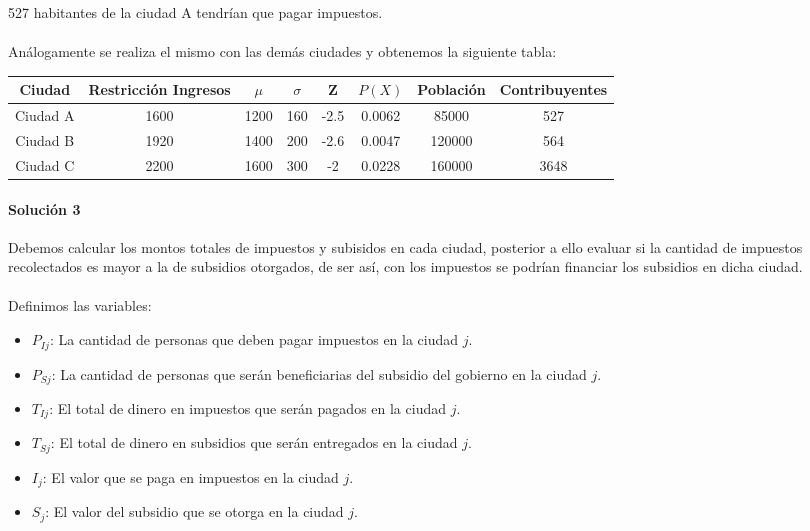 \documentclass{article}
\begin{document}
527 habitantes de la ciudad A tendrían que pagar impuestos.

\paragraph{} Análogamente se realiza el mismo con las demás ciudades y obtenemos la siguiente tabla:


\begin{center}
	\begin{tabular}{ | c | c | c | c | c | c | c | c | }
		\hline
		\textbf{Ciudad} & \textbf{Restricción Ingresos} & \textbf{$\mu$} & \textbf{$\sigma$} & \textbf{Z} & \textbf{$P(X)$} & \textbf{Población} & \textbf{Contribuyentes}\\
		\hline
		Ciudad A & 1600 & 1200 & 160 & -2.5 & 0.0062 & 85000 & 527 \\
		\hline
		Ciudad B & 1920 & 1400 & 200 & -2.6 & 0.0047 & 120000 & 564 \\
		\hline
		Ciudad C & 2200 & 1600 & 300 & -2 & 0.0228 & 160000 & 3648 \\
		\hline
	\end{tabular}
\end{center}

\paragraph{Solución 3} Debemos calcular los montos totales de impuestos y subisidos en cada ciudad, posterior a ello evaluar si la cantidad de impuestos recolectados es mayor a la de subsidios otorgados, de ser así, con los impuestos se podrían financiar los subsidios en dicha ciudad.

\paragraph{} Definimos las variables:

\begin{itemize}
	\item $P_{Ij}$: La cantidad de personas que deben pagar impuestos en la ciudad $j$.
	\item $P_{Sj}$: La cantidad de personas que serán beneficiarias del subsidio del gobierno en la ciudad $j$.
	\item $T_{Ij}$: El total de dinero en impuestos que serán pagados en la ciudad $j$.
	\item $T_{Sj}$: El total de dinero en subsidios que serán entregados en la ciudad $j$.
	\item $I_j$: El valor que se paga en impuestos en la ciudad $j$.
	\item $S_j$: El valor del subsidio que se otorga en la ciudad $j$.
\end{itemize}
\end{document}

